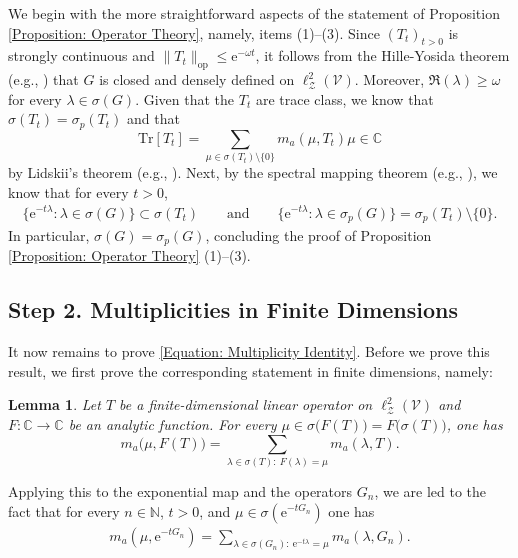 \documentclass{amsart}
\numberwithin{equation}{section}
\newtheorem{lemma}[theorem]{Lemma}
\theoremstyle{definition}
\newcommand\la{\lambda}
\newcommand\om{\omega}
\newcommand\si{\sigma}
\newcommand\mbb{\mathbb}
\newcommand\mr{\mathrm}
\newcommand\ms{\mathscr}
\begin{document}
We begin with the more straightforward aspects of the statement
of Proposition \ref{Proposition: Operator Theory}, namely, items (1)--(3).
Since $(T_t)_{t>0}$ is strongly continuous and $\|T_t\|_{\mr{op}}\leq\mr e^{-\om t}$,
it follows from the Hille-Yosida theorem (e.g., \cite[Chapter II, Corollary 3.6]{EngelNagel})
that $G$ is closed and densely defined on $\ell^2_\ms Z(\ms V)$.
Moreover, $\Re(\la)\geq\om$ for every $\la\in\si(G)$.
Given that the $T_t$ are trace class, we know that $\si(T_t)=\si_p(T_t)$ and that
\[\mr{Tr}[T_t]=\sum_{\mu\in\si(T_t)\setminus\{0\}}m_a(\mu,T_t)\mu\in\mbb C\]
by Lidskii's theorem
(e.g., \cite[Sections 3.6 and 3.12]{Simon}). Next,
by the spectral mapping theorem (e.g., \cite[Chapter IV, (3.7) and (3.16)]{EngelNagel}),
we know that for every $t>0$,
\begin{align}
\label{Equation: Spectral Mapping}
\big\{\mr e^{-t\la}:\la\in\si(G)\big\}\subset\si(T_t)
\qquad\text{and}\qquad
\big\{\mr e^{-t\la}:\la\in\si_p(G)\big\}=\si_p(T_t)\setminus\{0\}.
\end{align}
In particular, $\si(G)=\si_p(G)$, concluding the proof of 
Proposition \ref{Proposition: Operator Theory} (1)--(3).

%

\subsection{Step 2. Multiplicities in Finite Dimensions}

%

It now remains to prove \eqref{Equation: Multiplicity Identity}.
Before we prove this result, we first prove the corresponding statement
in finite dimensions, namely:

%

\begin{lemma}
\label{Lemma: Spectral Mapping in Finite Dimensions}
Let $T$ be a finite-dimensional linear operator on $\ell^2_\ms Z(\ms V)$
and $F:\mbb C\to\mbb C$ be an analytic function.
For every $\mu\in\si\big(F(T)\big)=F\big(\si(T)\big)$, one has
\[m_a\big(\mu,F(T)\big)=\sum_{\la\in\si(T):~F(\la)=\mu}m_a(\la,T).\]
\end{lemma}

%

Applying this to the exponential map and the operators $G_n$, we are led to
the fact that for every $n\in\mbb N$, $t>0$, and $\mu\in\si(\mr e^{-tG_n})$ one has
\begin{align}
\label{Equation: Algebraic Identity Prelimit}
m_a(\mu,\mr e^{-t G_n})=\sum_{\la\in\si(G_n):~\mr e^{-t\la}=\mu}m_a(\la,G_n).
\end{align}
\end{document}
